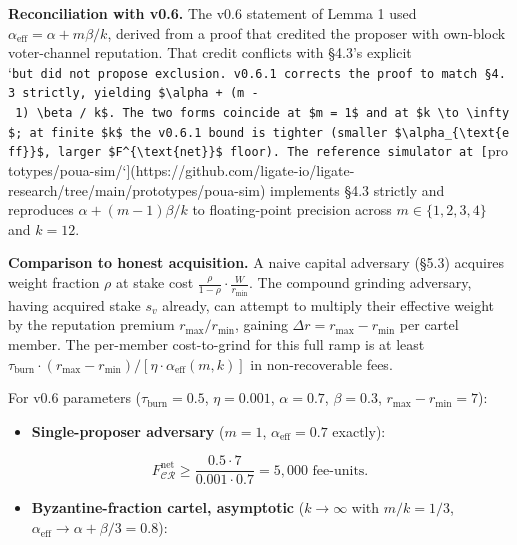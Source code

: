 \documentclass[
  11pt,
]{article}
\providecommand{\tightlist}{%
  \setlength{\itemsep}{0pt}\setlength{\parskip}{0pt}}
\begin{document}
\textbf{Reconciliation with v0.6.} The v0.6 statement of Lemma 1 used
\(\alpha_{\text{eff}} = \alpha + m \beta / k\), derived from a proof
that credited the proposer with own-block voter-channel reputation. That
credit conflicts with §4.3's explicit
`\texttt{but\ did\ not\ propose\textquotesingle{}\textquotesingle{}\ exclusion.\ v0.6.1\ corrects\ the\ proof\ to\ match\ §4.3\ strictly,\ yielding\ \$\textbackslash{}alpha\ +\ (m\ -\ 1)\ \textbackslash{}beta\ /\ k\$.\ The\ two\ forms\ coincide\ at\ \$m\ =\ 1\$\ and\ at\ \$k\ \textbackslash{}to\ \textbackslash{}infty\$;\ at\ finite\ \$k\$\ the\ v0.6.1\ bound\ is\ tighter\ (smaller\ \$\textbackslash{}alpha\_\{\textbackslash{}text\{eff\}\}\$,\ larger\ \$F\^{}\{\textbackslash{}text\{net\}\}\$\ floor).\ The\ reference\ simulator\ at\ {[}}prototypes/poua-sim/`{]}(https://github.com/ligate-io/ligate-research/tree/main/prototypes/poua-sim)
implements §4.3 strictly and reproduces \(\alpha + (m - 1) \beta / k\)
to floating-point precision across \(m \in \{1, 2, 3, 4\}\) and
\(k = 12\).

\textbf{Comparison to honest acquisition.} A naive capital adversary
(§5.3) acquires weight fraction \(\rho\) at stake cost
\(\frac{\rho}{1-\rho} \cdot \frac{W}{r_{\min}}\). The compound grinding
adversary, having acquired stake \(s_v\) already, can attempt to
multiply their effective weight by the reputation premium
\(r_{\max}/r_{\min}\), gaining \(\Delta r = r_{\max} - r_{\min}\) per
cartel member. The per-member cost-to-grind for this full ramp is at
least
\(\tau_{\text{burn}} \cdot (r_{\max} - r_{\min}) / [\eta \cdot \alpha_{\text{eff}}(m, k)]\)
in non-recoverable fees.

For v0.6 parameters (\(\tau_{\text{burn}} = 0.5\), \(\eta = 0.001\),
\(\alpha = 0.7\), \(\beta = 0.3\), \(r_{\max} - r_{\min} = 7\)):

\begin{itemize}
\tightlist
\item
  \textbf{Single-proposer adversary} (\(m = 1\),
  \(\alpha_{\text{eff}} = 0.7\) exactly):
\end{itemize}

\[F_{\mathcal{CR}}^{\text{net}} \geq \frac{0.5 \cdot 7}{0.001 \cdot 0.7} = 5{,}000 \text{ fee-units.}\]

\begin{itemize}
\tightlist
\item
  \textbf{Byzantine-fraction cartel, asymptotic} (\(k \to \infty\) with
  \(m / k = 1/3\), \(\alpha_{\text{eff}} \to \alpha + \beta/3 = 0.8\)):
\end{itemize}
\end{document}
